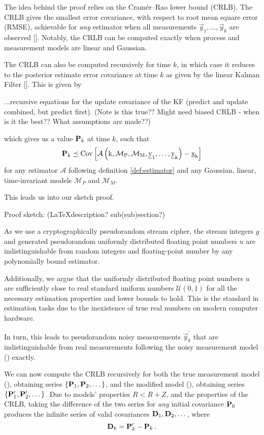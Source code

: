 \documentclass[conference]{IEEEtran}
\theoremstyle{definition}
\theoremstyle{definition}
\theoremstyle{remark}
\begin{document}
The idea behind the proof relies on the Cramér–Rao lower bound (CRLB). The CRLB gives the smallest error covariance, with respect to root mean square error (RMSE), achievable for \textit{any} estimator when all measurements $\vec{y}_1,\dots,\vec{y}_k$ are observed []. Notably, the CRLB can be computed exactly when process and measurement models are linear and Gaussian.

The CRLB can also be computed recursively for time $k$, in which case it reduces to the posterior estimate error covariance at time $k$ as given by the linear Kalman Filter []. This is given by

...recursive equations for the update covariance of the KF (predict and update combined, but predict first). (Note is this true?? Might need biased CRLB - when is it the best?? What assumptions are made??)

which gives us a value ${{\mathbf{P}}}_k$ at time $k$, such that
\begin{equation}
   \mat{P}_k \preceq \operatorfont{Cov}\left[\mathcal{A}\left(k, \mathcal{M}_P, \mathcal{M}_M, \vec{y}_1,\dots,\vec{y}_k\right) - \vec{x}_k \right]
\end{equation}
for any estimator $\mathcal{A}$ following definition \ref{def:estimator} and any Gaussian, linear, time-invariant models $\mathcal{M}_P$ and $\mathcal{M}_M$.

This leads us into our sketch proof.

Proof sketch: (LaTeXdescription? sub(sub)section?)

As we use a cryptographically pseudorandom stream cipher, the stream integers $g$ and generated pseudorandom uniformly distributed floating point numbers $u$ are indistinguishable from random integers and floating-point number by any polynomially bound estimator. 

Additionally, we argue that the uniformly distributed floating point numbers $u$ are sufficiently close to real standard uniform numbers $\mathcal{U}(0,1)$ for all the necessary estimation properties and lower bounds to hold. This is the standard in estimation tasks due to the inexistence of true real numbers on modern computer hardware.

In turn, this leads to pseudorandom noisy measurements $\vec{y}^\prime_k$ that are indistinguishable from real measurements following the noisy measurement model () exactly.

We can now compute the CRLB recursively for both the true measurement model (), obtaining series $\{{{\mathbf{P}}}_1,{{\mathbf{P}}}_2,\dots\}$, and the modified model (), obtaining series $\{{{\mathbf{P}}}^\prime_1,{{\mathbf{P}}}^\prime_2,\dots\}$. Due to models' properties $R<R+Z$, and the properties of the CRLB, taking the difference of the two series for \textit{any} initial covariance ${{\mathbf{P}}}_0$ produces the infinite series of valid covariances ${{\mathbf{D}}}_1,{{\mathbf{D}}}_2,\dots$, where
\begin{equation}
   {\ensuremath{{\mathbf{D}}}}_k = {{\mathbf{P}}}^\prime_k - {{\mathbf{P}}}_k\,.
\end{equation}
\end{document}
